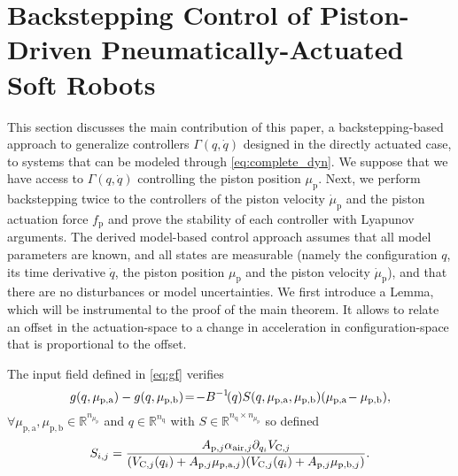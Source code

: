 \section{Backstepping Control of Piston-Driven Pneumatically-Actuated Soft Robots}\label{sec:backstepping_proof}

This section discusses the main contribution of this paper, a backstepping-based approach to generalize controllers $\Gamma(q,\dot{q})$ designed in the directly actuated case, to systems that can be modeled through \eqref{eq:complete_dyn}.
We suppose that we have access to $\Gamma(q, \dot{q})$ controlling the piston position $\mu_\mathrm{p}$. Next, we perform backstepping twice to the controllers of the piston velocity $\dot{\mu}_\mathrm{p}$ and the piston actuation force $f_\mathrm{p}$ and prove the stability of each controller with Lyapunov arguments.
The derived model-based control approach assumes that all model parameters are known, and all states are measurable (namely the configuration $q$, its time derivative $\dot{q}$, the piston position $\mu_\mathrm{p}$ and the piston velocity $\dot{\mu}_\mathrm{p}$), and that there are no disturbances or model uncertainties. 
We first introduce a Lemma, which will be instrumental to the proof of the main theorem. It allows to relate an offset in the actuation-space to a change in acceleration in configuration-space that is proportional to the offset.
%
\begin{Lemma}\label{lemma:f_g_S}%
The input field defined in \eqref{eq:gf} verifies
%
\begin{equation*}\small
    g(q,\mu_{\mathrm{p},\mathrm{a}}) - g(q,\mu_{\mathrm{p},\mathrm{b}}) \!=\!  -B^{-1}\!(q)S(q,\mu_{\mathrm{p},\mathrm{a}},\mu_{\mathrm{p},\mathrm{b}})(\mu_{\mathrm{p},\mathrm{a}} \!- \mu_{\mathrm{p},\mathrm{b}}),    
\end{equation*}
%
$\forall \mu_{\mathrm{p},\mathrm{a}},\mu_{\mathrm{p},\mathrm{b}} \in \mathbb{R}^{n_{\mu_\mathrm{p}}}$ and $q \in \mathbb{R}^{n_{\mathrm{q}}}$
	with $S \in \mathbb{R}^{n_{\mathrm{q}} \times n_{\mu_\mathrm{p}}} $ so defined
	\begin{equation*}\small
	    S_{i,j} = \frac{ A_{\mathrm{p},j} \alpha_{\mathrm{air},j} \partial_{q_i}V_{\mathrm{C},j}}{(V_{\mathrm{C},j}(q_i) + A_{\mathrm{p},j} \mu_{\mathrm{p},\mathrm{a},j})(V_{\mathrm{C},j}(q_i) + A_{\mathrm{p},j} \mu_{\mathrm{p},\mathrm{b},j})}.
	\end{equation*}
\end{Lemma}
%
